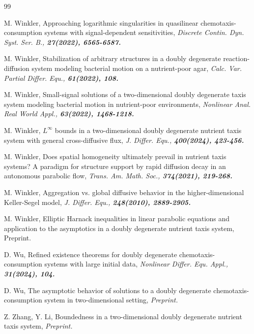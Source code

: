 \documentclass[12pt]{article}
\theoremstyle{plain}
\theoremstyle{definition}
\numberwithin{equation}{section}
\begin{document}
\begin{thebibliography}{99}



 M. Winkler, Approaching logarithmic singularities in quasilinear chemotaxis-consumption systems with signal-dependent sensitivities, \it Discrete Contin. Dyn. Syst. Ser. B., \bf27\rm (2022), 6565-6587.

 M. Winkler, Stabilization of arbitrary structures in a doubly degenerate reaction-diffusion system modeling bacterial motion
    on a nutrient-poor agar, \it Calc. Var. Partial Differ. Equ., \bf 61\rm (2022), 108.

 M. Winkler, Small-signal solutions of a two-dimensional doubly degenerate taxis system modeling bacterial motion in
    nutrient-poor environments, \it Nonlinear Anal. Real World Appl., \bf63\rm(2022), 1468-1218.

 M. Winkler, $L^{\infty}$ bounds in a two-dimensional doubly degenerate nutrient taxis system with general cross-diffusive flux,
    \it J. Differ. Equ., \bf400\rm(2024), 423-456.

 M. Winkler, Does spatial homogeneity ultimately prevail in nutrient taxis systems? A paradigm for structure support by rapid
    diffusion decay in an autonomous parabolic flow, \it Trans. Am. Math. Soc., \bf374\rm(2021), 219-268.

 M. Winkler, Aggregation vs. global diffusive behavior in the higher-dimensional Keller-Segel model, \it J. Differ. Equ.,
    \bf248\rm(2010), 2889-2905.

 M. Winkler, Elliptic Harnack inequalities in linear parabolic equations and application to the asymptotics in a doubly degenerate nutrient taxis system, Preprint.

 D. Wu, Refined existence theorems for doubly degenerate chemotaxis-consumption systems with large initial data, \it  Nonlinear
    Differ. Equ. Appl., \bf31\rm(2024), 104.

 D. Wu, The asymptotic behavior of solutions to a doubly degenerate chemotaxis-consumption system in two-dimensional setting, \it Preprint.\rm

 Z. Zhang, Y. Li, Boundedness in a two-dimensional doubly degenerate nutrient taxis system, \it Preprint.
\end{thebibliography}
\end{document}

